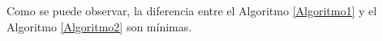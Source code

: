 \documentclass[12pt]{article}
\begin{document}
Como se puede observar, la diferencia entre el Algoritmo \ref{Algoritmo1} y el Algoritmo \ref{Algoritmo2} son m\'inimas.



\end{document}

